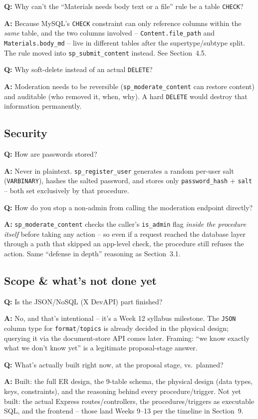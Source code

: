 \documentclass[11pt]{article}
\newcommand{\qitem}[2]{%
  \par\medskip\noindent\textbf{\color{accentc}Q:} #1\par
  \noindent\textbf{A:} #2\par
}
\begin{document}
\qitem{Why can't the ``Materials needs body text or a file'' rule be a table \texttt{CHECK}?}{Because MySQL's \texttt{CHECK} constraint can only reference columns within the \emph{same} table, and the two columns involved -- \texttt{Content.file\_path} and \texttt{Materials.body\_md} -- live in different tables after the supertype/subtype split. The rule moved into \texttt{sp\_submit\_content} instead. See Section~4.5.}

\qitem{Why soft-delete instead of an actual \texttt{DELETE}?}{Moderation needs to be reversible (\texttt{sp\_moderate\_content} can restore content) and auditable (who removed it, when, why). A hard \texttt{DELETE} would destroy that information permanently.}

\subsection{Security}

\qitem{How are passwords stored?}{Never in plaintext. \texttt{sp\_register\_user} generates a random per-user salt (\texttt{VARBINARY}), hashes the salted password, and stores only \texttt{password\_hash} + \texttt{salt} -- both set exclusively by that procedure.}

\qitem{How do you stop a non-admin from calling the moderation endpoint directly?}{\texttt{sp\_moderate\_content} checks the caller's \texttt{is\_admin} flag \emph{inside the procedure itself} before taking any action -- so even if a request reached the database layer through a path that skipped an app-level check, the procedure still refuses the action. Same ``defense in depth'' reasoning as Section~3.1.}

\subsection{Scope \& what's not done yet}

\qitem{Is the JSON/NoSQL (X DevAPI) part finished?}{No, and that's intentional -- it's a Week 12 syllabus milestone. The \texttt{JSON} column type for \texttt{format}/\texttt{topics} is already decided in the physical design; querying it via the document-store API comes later. Framing: ``we know exactly what we don't know yet'' is a legitimate proposal-stage answer.}

\qitem{What's actually built right now, at the proposal stage, vs.\ planned?}{Built: the full ER design, the 9-table schema, the physical design (data types, keys, constraints), and the reasoning behind every procedure/trigger. Not yet built: the actual Express routes/controllers, the procedures/triggers as executable SQL, and the frontend -- those land Weeks 9--13 per the timeline in Section~9.}
\end{document}
